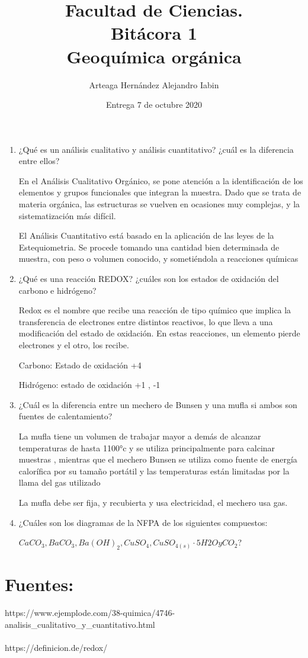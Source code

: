 \documentclass{article}
\title{Facultad de Ciencias. \\Bitácora 1 \\ Geoquímica orgánica}
\author{Arteaga Hernández Alejandro Iabin }
\date{Entrega 7 de octubre 2020}
\begin{document}
\maketitle

\begin{enumerate}
    \item ¿Qué es un análisis cualitativo y análisis cuantitativo? ¿cuál es la
diferencia entre ellos?

En el Análisis Cualitativo Orgánico, se pone atención a la identificación de los elementos y grupos funcionales que integran la muestra. Dado que se trata de materia orgánica, las estructuras se vuelven en ocasiones muy complejas, y la sistematización más difícil.


El Análisis Cuantitativo está basado en la aplicación de las leyes de la Estequiometria. Se procede tomando una cantidad bien determinada de muestra, con peso o volumen conocido, y sometiéndola a reacciones químicas


 \item ¿Qué es una reacción REDOX? ¿cuáles son los estados de
oxidación del carbono e hidrógeno?

Redox es el nombre que recibe una reacción de tipo químico que implica la transferencia de electrones entre distintos reactivos, lo que lleva a una modificación del estado de oxidación. En estas reacciones, un elemento pierde electrones y el otro, los recibe.


Carbono: Estado de oxidación	+4

Hidrógeno: estado de oxidación +1 , -1

\item ¿Cuál es la diferencia entre un mechero de Bunsen y una mufla
si ambos son fuentes de calentamiento?


La mufla tiene un  volumen de trabajar mayor a demás de alcanzar temperaturas de hasta 1100°c y se utiliza principalmente para calcinar muestras , mientras que el mechero Bunsen se utiliza como fuente de energía calorífica por su tamaño portátil y las temperaturas están limitadas por la llama del gas utilizado


La mufla debe ser fija, y recubierta y usa electricidad, el mechero usa gas.

\item ¿Cuáles son los diagramas de la NFPA de los siguientes
compuestos: 

$CaCO_3, BaCO_3, Ba(OH)_2, CuSO_4, CuSO_{4(s)} · 5H2O
y CO_2$?
\end{enumerate}

\section{Fuentes:}

https://www.ejemplode.com/38-quimica/4746-analisis\_cualitativo\_y\_cuantitativo.html
\\\\
https://definicion.de/redox/
\end{document}
